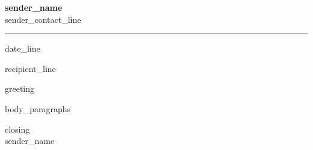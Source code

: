 \documentclass[11pt,a4paper]{article}
\begin{document}
\noindent
{\Huge\bfseries\color{bar} {{sender_name}}}\\[2pt]
{\small\color{muted} {{sender_contact_line}}}\\[6pt]
\noindent\textcolor{bar}{\rule{\linewidth}{2pt}}

\vspace{10pt}

\begin{flushright}
  {{date_line}}
\end{flushright}

{{recipient_line}}

\vspace{6pt}

{{greeting}}

{{body_paragraphs}}

\vspace{4pt}

{{closing}}\\[24pt]
{{sender_name}}
\end{document}
